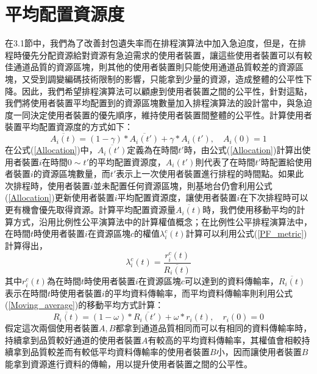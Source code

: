 \section{平均配置資源度}
在3.1節中，我們為了改善封包遺失率而在排程演算法中加入急迫度，但是，在排程時優先分配資源給對資源有急迫需求的使用者裝置，讓這些使用者裝置可以有較佳通道品質的資源區塊，則其他的使用者裝置則只能使用通道品質較差的資源區塊，又受到調變編碼技術限制的影響，只能拿到少量的資源，造成整體的公平性下降。因此，我們希望排程演算法可以顧慮到使用者裝置之間的公平性，針對這點，我們將使用者裝置平均配置到的資源區塊數量加入排程演算法的設計當中，與急迫度一同決定使用者裝置的優先順序，維持使用者裝置間整體的公平性。計算使用者裝置平均配置資源度的方式如下：
\begin{equation}
\label{Allocation}
\overline{A_i(t)}=(1-\gamma)*\overline{A_i(t')}+\gamma*A_i(t'),\quad A_i(0)=1
\end{equation}
在公式(\ref{Allocation})中，$\overline{A_i(t')}$定義為在時間$t'$時，由公式(\ref{Allocation})計算出使用者裝置$i$在時間$0\sim t'$的平均配置資源度，$A_i(t')$則代表了在時間$t'$時配置給使用者裝置$i$的資源區塊數量，而$t'$表示上一次使用者裝置進行排程的時間點。如果此次排程時，使用者裝置$i$並未配置任何資源區塊，則基地台仍會利用公式(\ref{Allocation})更新使用者裝置$i$平均配置資源度，讓使用者裝置$i$在下次排程時可以更有機會優先取得資源。計算平均配置資源量$\overline{A_i(t)}$時，我們使用移動平均的計算方式，沿用比例性公平演算法\cite{lee2009}中的計算權值概念；在比例性公平排程演算法中，在時間$t$時使用者裝置$i$在資源區塊$c$的權值$\lambda_i^c(t)$計算可以利用公式(\ref{PF_metric})計算得出，
\begin{equation}
\label{PF}
\lambda_i^c(t)=\dfrac{r_i^c(t)}{\overline{R_i(t)}}
\end{equation}
其中$r_i^c(t)$為在時間$t$時使用者裝置$i$在資源區塊$c$可以達到的資料傳輸率，$\overline{R_i(t)}$表示在時間$t$時使用者裝置$i$的平均資料傳輸率，而平均資料傳輸率則利用公式(\ref{Moving_average})\cite{kim2012}的移動平均方式計算：
\begin{equation}
\label{Moving_average}
\overline{R_i(t)}=(1-\omega)*\overline{R_i(t')}+\omega*r_i(t),\quad r_i(0)=0
\end{equation}
假定這次兩個使用者裝置$A,B$都拿到通道品質相同而可以有相同的資料傳輸率時，持續拿到品質較好通道的使用者裝置$A$有較高的平均資料傳輸率，其權值會相較持續拿到品質較差而有較低平均資料傳輸率的使用者裝置$B$小，因而讓使用者裝置$B$能拿到資源進行資料的傳輸，用以提升使用者裝置之間的公平性。


